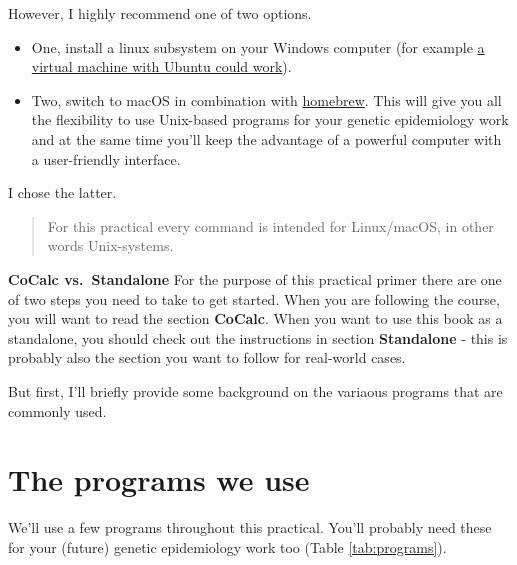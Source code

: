 \documentclass[
]{book}
\providecommand{\tightlist}{%
  \setlength{\itemsep}{0pt}\setlength{\parskip}{0pt}}
\begin{document}
However, I highly recommend one of two options.

\begin{itemize}
\tightlist
\item
  One, install a linux subsystem on your Windows computer (for example \href{https://blog.storagecraft.com/the-dead-simple-guide-to-installing-a-linux-virtual-machine-on-windows/}{a virtual machine with Ubuntu could work}).
\item
  Two, switch to macOS in combination with \href{https://brew.sh}{homebrew}. This will give you all the flexibility to use Unix-based programs for your genetic epidemiology work and at the same time you'll keep the advantage of a powerful computer with a user-friendly interface.
\end{itemize}

I chose the latter.

\begin{quote}
For this practical every command is intended for Linux/macOS, in other words Unix-systems.
\end{quote}

\textbf{CoCalc vs.~Standalone}
For the purpose of this practical primer there are one of two steps you need to take to get started. When you are following the course, you will want to read the section \textbf{CoCalc}. When you want to use this book as a standalone, you should check out the instructions in section \textbf{Standalone} - this is probably also the section you want to follow for real-world cases.

But first, I'll briefly provide some background on the variaous programs that are commonly used.

\hypertarget{the-programs-we-use}{%
\section{The programs we use}\label{the-programs-we-use}}

We'll use a few programs throughout this practical. You'll probably need these for your (future) genetic epidemiology work too (Table \ref{tab:programs}).
\end{document}
